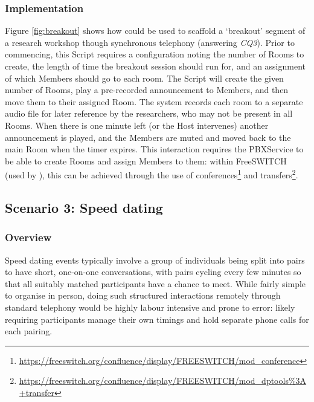 \subsubsection{\ONT{} Implementation}

Figure \ref{fig:breakout} shows how \ONT{} could be used to scaffold a `breakout' segment of a research workshop though synchronous telephony (answering \textit{CQ3}). Prior to commencing, this Script requires a configuration noting the number of Rooms to create, the length of time the breakout session should run for, and an assignment of which Members should go to each room. The Script will create the given number of Rooms, play a pre-recorded announcement to Members, and then move them to their assigned Room. The system records each room to a separate audio file for later reference by the researchers, who may not be present in all Rooms. When there is one minute left (or the Host intervenes) another announcement is played, and the Members are muted and moved back to the main Room when the timer expires. This interaction requires the PBXService to be able to create Rooms and assign Members to them: within FreeSWITCH (used by \cite{Kazakos2016, Talhouk2017, Yadav2017}), this can be achieved through the use of conferences\footnote{\url{https://freeswitch.org/confluence/display/FREESWITCH/mod\_conference}} and transfers\footnote{\url{https://freeswitch.org/confluence/display/FREESWITCH/mod\_dptools\%3A+transfer}}.


\subsection{Scenario 3: Speed dating}

\subsubsection{Overview}

Speed dating events typically involve a group of individuals being split into pairs to have short, one-on-one conversations, with pairs cycling every few minutes so that all suitably matched participants have a chance to meet. While fairly simple to organise in person, doing such structured interactions remotely through standard telephony would be highly labour intensive and prone to error: likely requiring participants manage their own timings and hold separate phone calls for each pairing.


